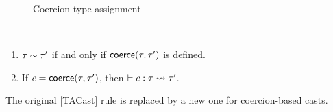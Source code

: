 \documentclass[index.tex]{subfiles}
\begin{document}
\begin{figure}[htb!]
  \begin{mathpar}








  \end{mathpar}
  \caption{Coercion type assignment}
  \label{fig:coercion-types}
\end{figure}

\begin{lemmat}[name=Well-typed coercions] \
  \begin{enumerate}
    \item $\isConsistent{\TMV}{\TMV'}$ if and only if $\coerce(\TMV, \TMV')$ is defined.
    \item If $\CMV = \coerce(\TMV, \TMV')$, then $\ctxCoercesType{}{\CMV}{\TMV}{\TMV'}$.
  \end{enumerate}
\end{lemmat}

The original [TACast] rule is replaced by a new one for coercion-based casts.
 
\end{document}
